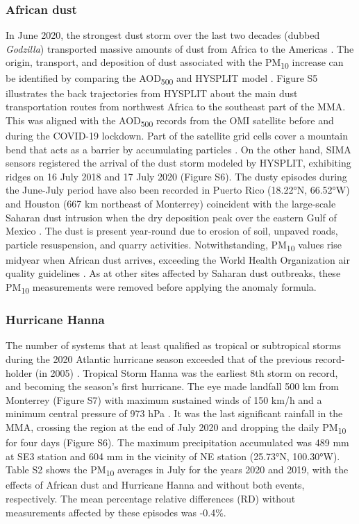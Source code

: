 \documentclass[preprint,12pt]{elsarticle}
\begin{document}
\subsubsection{African dust}
In June 2020, the strongest dust storm over the last two decades (dubbed \textit{Godzilla}) transported massive amounts of dust from Africa to the Americas \citep{Francis_2020}. The origin, transport, and deposition of dust associated with the PM\textsubscript{10} increase can be identified by comparing the AOD\textsubscript{500} and HYSPLIT model \citep{Yassin_2018}. Figure S5 illustrates the back trajectories from HYSPLIT about the main dust transportation routes from northwest Africa to the southeast part of the MMA. This was aligned with the AOD\textsubscript{500} records from the OMI satellite before and during the COVID-19 lockdown. Part of the satellite grid cells cover a mountain bend that acts as a barrier by accumulating particles \citep{Gonz_lez_Santiago_2011,Martinez_2012}. On the other hand, SIMA sensors registered the arrival of the dust storm modeled by HYSPLIT, exhibiting ridges on 16 July 2018 and 17 July 2020 (Figure S6). The dusty episodes during the June-July period have also been recorded in Puerto Rico (18.22°N, 66.52°W) \citep{Euphrasie_Clotilde_2020} and Houston (667 km northeast of Monterrey) coincident with the large-scale Saharan dust intrusion \citep{Bozlaker_2013} when the dry deposition peak over the eastern Gulf of Mexico \citep{Lenes_2012}. The dust is present year-round due to erosion of soil, unpaved roads, particle resuspension, and quarry activities. Notwithstanding, PM\textsubscript{10} values rise midyear when African dust arrives, exceeding the World Health Organization air quality guidelines \citep{Prospero_2014}. As at other sites affected by Saharan dust outbreaks, these PM\textsubscript{10} measurements were removed \citep{Clemente_2022} before applying the anomaly formula.
\subsubsection{Hurricane Hanna}
The number of systems that at least qualified as tropical or subtropical storms during the 2020 Atlantic hurricane season exceeded that of the previous record-holder (in 2005) \citep{stefano2021,Beven_2021}. Tropical Storm Hanna was the earliest 8th storm on record, and becoming the season's first hurricane. The eye made landfall 500 km from Monterrey (Figure S7) with maximum sustained winds of 150 km/h and a minimum central pressure of 973 hPa \citep{conagua}. It was the last significant rainfall in the MMA, crossing the region at the end of July 2020 and dropping the daily PM\textsubscript{10} for four days (Figure S6). The maximum precipitation accumulated was 489 mm at SE3 station and 604 mm in the vicinity of NE station (25.73°N, 100.30°W). Table S2 shows the PM\textsubscript{10} averages in July for the years 2020 and 2019, with the effects of African dust and Hurricane Hanna and without both events, respectively. The mean percentage relative differences (RD) without measurements affected by these episodes was -0.4\%.
\end{document}
